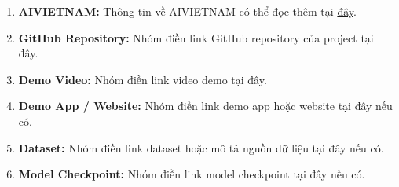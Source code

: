 \documentclass[12pt]{ai_conquer2026}
\begin{document}
\newpage
\begin{appendices}
\begin{enumerate}
\item \textbf{AIVIETNAM:} Thông tin về AIVIETNAM có thể đọc thêm tại \href{https://aivietnam.edu.vn/}{đây}.
\item \textbf{GitHub Repository:} Nhóm điền link GitHub repository của project tại đây.
\item \textbf{Demo Video:} Nhóm điền link video demo tại đây.
\item \textbf{Demo App / Website:} Nhóm điền link demo app hoặc website tại đây nếu có.
\item \textbf{Dataset:} Nhóm điền link dataset hoặc mô tả nguồn dữ liệu tại đây nếu có.
\item \textbf{Model Checkpoint:} Nhóm điền link model checkpoint tại đây nếu có.
\end{enumerate}
\end{appendices}
\end{document}
